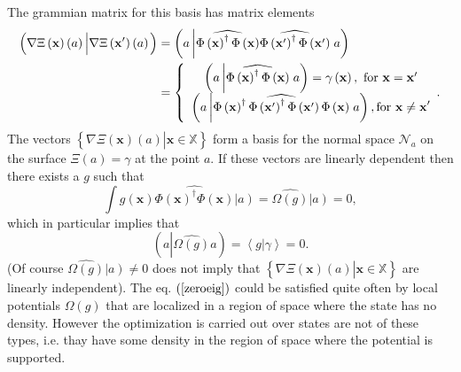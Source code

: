 \documentclass[aps,preprint]{revtex4}%
\begin{document}
The grammian matrix for this basis has matrix elements
\begin{align}
\left(  \overset{}{\nabla\Xi\left(  \mathbf{x}\right)  \left(  a\right)
}\left\vert \overset{}{\nabla\Xi\left(  \mathbf{x}^{\prime}\right)  \left(
a\right)  }\right.  \right)   &  =\left(  a\left\vert \widehat{\Phi\left(
\mathbf{x}\right)  ^{\dagger}\Phi\left(  \mathbf{x}\right)  }\widehat
{\Phi\left(  \mathbf{x}^{\prime}\right)  ^{\dagger}\Phi\left(  \mathbf{x}%
^{\prime}\right)  }\right.  a\right)  \nonumber\\
&  =\left\{
\begin{array}
[c]{c}%
\left(  a\left\vert \widehat{\Phi\left(  \mathbf{x}\right)  ^{\dagger}%
\Phi\left(  \mathbf{x}\right)  }\right.  a\right)  =\gamma\left(
\mathbf{x}\right)  ,\text{ for }\mathbf{x=x}^{\prime}\\
\left(  a\left\vert \widehat{\Phi\left(  \mathbf{x}\right)  ^{\dagger}%
\Phi\left(  \mathbf{x}^{\prime}\right)  ^{\dagger}\Phi\left(  \mathbf{x}%
^{\prime}\right)  \Phi\left(  \mathbf{x}\right)  }\right.  a\right)
,\text{for }\mathbf{x\neq x}^{\prime}%
\end{array}
.\right.
\end{align}
The vectors $\left\{  \left.  \overset{}{\nabla\Xi\left(  \mathbf{x}\right)
\left(  a\right)  }\right\vert \mathbf{x\in}\mathbb{X}\right\}  $ form a basis
for the normal space $\mathcal{N}_{a}$ on the surface $\Xi\left(  a\right)
=\gamma$ at the point $a.$ If these vectors are linearly dependent then there
exists a $g$ such that
\begin{equation}
\int g\left(  \mathbf{x}\right)  \widehat{\Phi\left(  \mathbf{x}\right)
^{\dagger}\Phi\left(  \mathbf{x}\right)  }\left\vert \overset{}{a}\right)
=\widehat{\Omega\left(  g\right)  }\left\vert \overset{}{a}\right)
=0,\label{roeig}%
\end{equation}
which in particular implies that
\begin{equation}
\left(  a\left\vert \widehat{\Omega\left(  g\right)  }\right.  a\right)
=\left\langle \left.  g\right\vert \gamma\right\rangle =0.
\end{equation}
(Of course $\widehat{\Omega\left(  g\right)  }\left\vert \overset{}{a}\right)
\neq0$ does not imply that $\left\{  \left.  \overset{}{\nabla\Xi\left(
\mathbf{x}\right)  \left(  a\right)  }\right\vert \mathbf{x\in}\mathbb{X}%
\right\}  $ are linearly independent). The eq. $\left(  \ref{zeroeig}\right)
$ could be satisfied quite often by local potentials $\Omega\left(  g\right)
$ that are localized in a region of space where the state has no density.
However the optimization is carried out over states are not of these types,
i.e. thay have some density in the region of space where the potential is
supported. 
\end{document}
